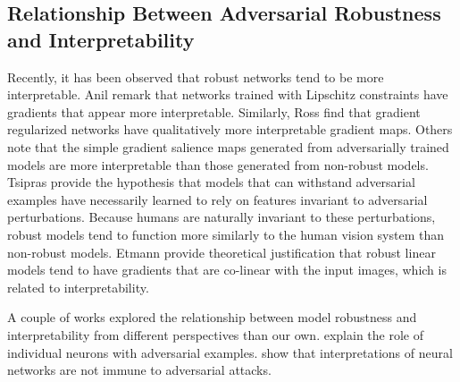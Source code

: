 \subsection{Relationship Between Adversarial Robustness and Interpretability} \label{subsec:adv_robustness_and_interp}



Recently, it has been observed that robust networks tend to be more interpretable. Anil \etal \cite{lipschitz_nets_interp} remark that networks trained with Lipschitz constraints have gradients that appear more interpretable. Similarly, Ross \etal \cite{input_grad_reg} find that gradient regularized networks have qualitatively more interpretable gradient maps. Others \cite{robustness_vs_accuracy,prasad} note that the simple gradient salience maps generated from adversarially trained models are more interpretable than those generated from non-robust models. Tsipras \etal \cite{robustness_vs_accuracy} provide the hypothesis that models that can withstand adversarial examples have necessarily learned to rely on features invariant to adversarial perturbations. Because humans are naturally invariant to these perturbations, robust models tend to function more similarly to the human vision system than non-robust models. Etmann \etal \cite{robustness_interpretability} provide theoretical justification that robust linear models tend to have gradients that are co-linear with the input images, which is related to interpretability.

A couple of works explored the relationship between model robustness and interpretability from different perspectives than our own. \cite{Dong2017} explain the role of individual neurons with adversarial examples.  \cite{frgagile_interpretations} show that interpretations of neural networks are not immune to adversarial attacks. 

